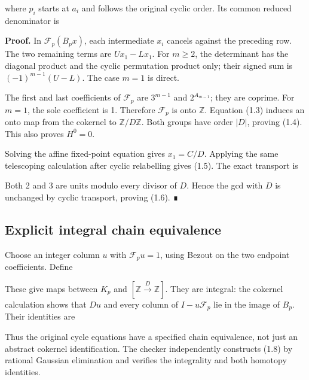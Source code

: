 
where \(p_i\) starts at \(a_i\) and follows the original cyclic order.
Its common reduced denominator is


\textbf{Proof.} In \(\mathcal F_p(B_px)\), each intermediate \(x_i\)
cancels against the preceding row. The two remaining terms are
\(Ux_1-Lx_1\). For \(m\ge2\), the determinant has the diagonal product
and the cyclic permutation product only; their signed sum is
\((-1)^{m-1}(U-L)\). The case \(m=1\) is direct.

The first and last coefficients of \(\mathcal F_p\) are \(3^{m-1}\) and
\(2^{A_{m-1}}\); they are coprime. For \(m=1\), the sole coefficient is
1. Therefore \(\mathcal F_p\) is onto \(\mathbb Z\). Equation (1.3)
induces an onto map from the cokernel to \(\mathbb Z/D\mathbb Z\). Both
groups have order \(|D|\), proving (1.4). This also proves \(H^0=0\).

Solving the affine fixed-point equation gives \(x_1=C/D\). Applying the
same telescoping calculation after cyclic relabelling gives (1.5). The
exact transport is


Both 2 and 3 are units modulo every divisor of \(D\). Hence the gcd with
\(D\) is unchanged by cyclic transport, proving (1.6). ∎

\subsection{Explicit integral chain equivalence}

Choose an integer column \(u\) with \(\mathcal F_pu=1\), using Bezout on
the two endpoint coefficients. Define


These give maps between \(K_p\) and
\([\mathbb Z\xrightarrow D\mathbb Z]\). They are integral: the cokernel
calculation shows that \(Du\) and every column of \(I-u\mathcal F_p\)
lie in the image of \(B_p\). Their identities are


Thus the original cycle equations have a specified chain equivalence,
not just an abstract cokernel identification. The checker independently
constructs (1.8) by rational Gaussian elimination and verifies the
integrality and both homotopy identities.

